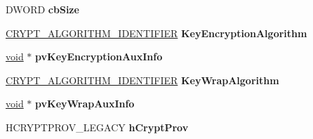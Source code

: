 \begin{DoxyCompactItemize}
\item 
\mbox{\label{struct___c_m_s_g___k_e_y___a_g_r_e_e___r_e_c_i_p_i_e_n_t___e_n_c_o_d_e___i_n_f_o_ace45fd9821ab8513e9b5a7c5b5c5e4b9}} 
D\+W\+O\+RD {\bfseries cb\+Size}
\item 
\mbox{\label{struct___c_m_s_g___k_e_y___a_g_r_e_e___r_e_c_i_p_i_e_n_t___e_n_c_o_d_e___i_n_f_o_a43dd2a4b042f0730ab52d28dd3a49fbc}} 
\hyperlink{struct___c_r_y_p_t___a_l_g_o_r_i_t_h_m___i_d_e_n_t_i_f_i_e_r}{C\+R\+Y\+P\+T\+\_\+\+A\+L\+G\+O\+R\+I\+T\+H\+M\+\_\+\+I\+D\+E\+N\+T\+I\+F\+I\+ER} {\bfseries Key\+Encryption\+Algorithm}
\item 
\mbox{\label{struct___c_m_s_g___k_e_y___a_g_r_e_e___r_e_c_i_p_i_e_n_t___e_n_c_o_d_e___i_n_f_o_a2926d885ac7eed35e40541c6253505f1}} 
\hyperlink{interfacevoid}{void} $\ast$ {\bfseries pv\+Key\+Encryption\+Aux\+Info}
\item 
\mbox{\label{struct___c_m_s_g___k_e_y___a_g_r_e_e___r_e_c_i_p_i_e_n_t___e_n_c_o_d_e___i_n_f_o_a253956084ea9b759178f55d0a64e03a9}} 
\hyperlink{struct___c_r_y_p_t___a_l_g_o_r_i_t_h_m___i_d_e_n_t_i_f_i_e_r}{C\+R\+Y\+P\+T\+\_\+\+A\+L\+G\+O\+R\+I\+T\+H\+M\+\_\+\+I\+D\+E\+N\+T\+I\+F\+I\+ER} {\bfseries Key\+Wrap\+Algorithm}
\item 
\mbox{\label{struct___c_m_s_g___k_e_y___a_g_r_e_e___r_e_c_i_p_i_e_n_t___e_n_c_o_d_e___i_n_f_o_a98bf741b91453ae9cbcf5a0c04db2e1b}} 
\hyperlink{interfacevoid}{void} $\ast$ {\bfseries pv\+Key\+Wrap\+Aux\+Info}
\item 
\mbox{\label{struct___c_m_s_g___k_e_y___a_g_r_e_e___r_e_c_i_p_i_e_n_t___e_n_c_o_d_e___i_n_f_o_a9f6c199808644c7045ede26c982b396a}} 
H\+C\+R\+Y\+P\+T\+P\+R\+O\+V\+\_\+\+L\+E\+G\+A\+CY {\bfseries h\+Crypt\+Prov}
\item 

\end{DoxyCompactItemize}
